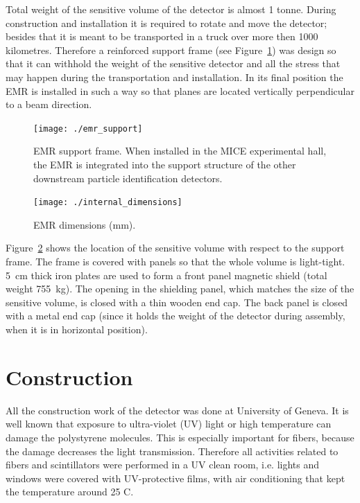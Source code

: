 \documentclass[a4paper,11pt]{article}
\begin{document}
Total weight of the sensitive volume of the detector is almost 1 tonne. During construction and installation it is required to rotate and move the detector;
besides that it is meant to be transported in a truck over more then 1000 kilometres. Therefore a reinforced support frame (see Figure~\ref{fig:emr_support})
was design so that it can withhold the weight of the sensitive detector and all the stress that may happen during the transportation and installation. In its
final position the EMR is installed in such a way so that planes are located vertically perpendicular to a beam direction. 

\begin{figure}[htp!]
 \centering 
 \texttt{[image: ./emr\_support]}
 \caption[EMR support frame]{EMR support frame. When installed in the MICE experimental hall, the EMR is integrated into the support structure of the other 
 downstream particle identification detectors.}
 \label{fig:emr_support}
\end{figure}

\begin{figure}[htp!]
 \centering
 \texttt{[image: ./internal\_dimensions]}
 \caption[EMR dimensions]{EMR dimensions (mm).}
 \label{fig:internal_dimensions}
\end{figure}

Figure~\ref{fig:internal_dimensions} shows the location of the sensitive volume with respect to the support frame. The frame is covered with panels so that
the whole volume is light-tight. 5~cm thick iron plates are used to form a front panel magnetic shield (total weight 755~kg). The opening in the shielding
panel, which matches the size of the sensitive volume, is closed with a thin wooden end cap. The back panel is closed with a metal end cap (since it holds
the weight of the detector during assembly, when it is in horizontal position).

\section{Construction}\label{sec:construction}

All the construction work of the detector was done at University of Geneva. It is well known that exposure to ultra-violet (UV) light or high temperature
can damage the polystyrene molecules. This is especially important for fibers, because the damage decreases the light transmission. Therefore all activities
related to fibers and scintillators were performed in a UV clean room, i.e. lights and windows were covered with UV-protective films, with air conditioning
that kept the temperature around 25 \degree C. 
\end{document}
